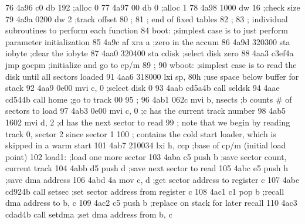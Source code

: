  76      4a96 c0                   db     192            ;alloc 0
 77      4a97 00                   db     0              ;alloc 1
 78      4a98 1000                 dw     16             ;check size
 79      4a9a 0200                 dw     2              ;track offset
 80                       ;
 81                       ;        end of fixed tables
 82                       ;
 83                       ;        individual subroutines to perform each function
 84                       boot:    ;simplest case is to just perform parameter initialization
 85      4a9c af                   xra    a              ;zero in the accum
 86      4a9d 320300               sta    iobyte         ;clear the iobyte
 87      4aa0 320400               sta    cdisk          ;select disk zero
 88      4aa3 c3ef4a               jmp    gocpm          ;initialize and go to cp/m
 89                       ;
 90                       wboot:   ;simplest case is to read the disk until all sectors loaded
 91      4aa6 318000               lxi    sp, 80h        ;use space below buffer for stack
 92      4aa9 0e00                 mvi    c, 0           ;select disk 0
 93      4aab cd5a4b               call   seldsk
 94      4aae cd544b               call   home           ;go to track 00
 95                       ;
 96      4ab1 062c                 mvi    b, nsects      ;b counts # of sectors to load
 97      4ab3 0e00                 mvi    c, 0           ;c has the current track number
 98      4ab5 1602                 mvi    d, 2           ;d has the next sector to read
 99                       ;        note that we begin by reading track 0, sector 2 since sector 1
100                       ;        contains the cold start loader, which is skipped in a warm start
101      4ab7 210034               lxi    h, ccp         ;base of cp/m (initial load point)
102                       load1:   ;load one more sector
103      4aba c5                   push   b              ;save sector count, current track
104      4abb d5                   push   d              ;save next sector to read
105      4abc e5                   push   h              ;save dma address
106      4abd 4a                   mov    c, d           ;get sector address to register c
107      4abe cd924b               call   setsec         ;set sector address from register c
108      4ac1 c1                   pop    b              ;recall dma address to b, c
109      4ac2 c5                   push   b              ;replace on stack for later recall
110      4ac3 cdad4b               call   setdma         ;set dma address from b, c
